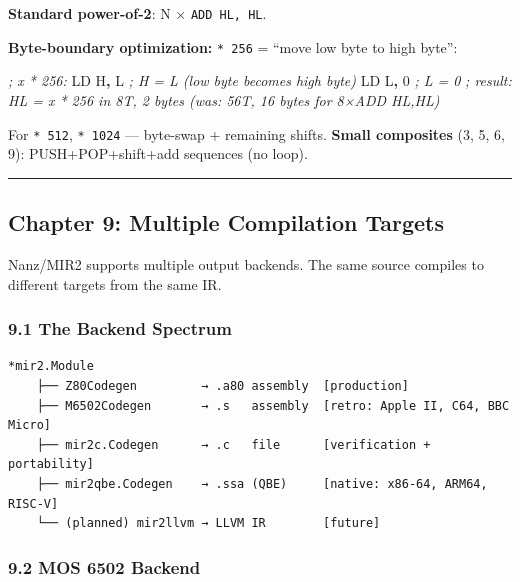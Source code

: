 \documentclass[
  11pt,
]{article}
\newenvironment{Shaded}{\begin{snugshade}}{\end{snugshade}}
\newcommand{\CommentTok}[1]{\textcolor[rgb]{0.56,0.35,0.01}{\textit{#1}}}
\newcommand{\DecValTok}[1]{\textcolor[rgb]{0.00,0.00,0.81}{#1}}
\newcommand{\NormalTok}[1]{#1}
\newcommand{\OperatorTok}[1]{\textcolor[rgb]{0.81,0.36,0.00}{\textbf{#1}}}
\begin{document}
\textbf{Standard power-of-2}: N × \texttt{ADD\ HL,\ HL}.

\textbf{Byte-boundary optimization:} \texttt{*\ 256} = ``move low byte
to high byte'':

\begin{Shaded}
\begin{Highlighting}[]
\CommentTok{; x * 256:}
\NormalTok{LD H}\OperatorTok{,}\NormalTok{ L     }\CommentTok{; H = L (low byte becomes high byte)}
\NormalTok{LD L}\OperatorTok{,} \DecValTok{0}     \CommentTok{; L = 0}
\CommentTok{; result: HL = x * 256 in 8T, 2 bytes (was: 56T, 16 bytes for 8×ADD HL,HL)}
\end{Highlighting}
\end{Shaded}

For \texttt{*\ 512}, \texttt{*\ 1024} --- byte-swap + remaining shifts.
\textbf{Small composites} (3, 5, 6, 9): PUSH+POP+shift+add sequences (no
loop).

\begin{center}\rule{0.5\linewidth}{0.5pt}\end{center}

\hypertarget{chapter-9-multiple-compilation-targets}{%
\subsection{Chapter 9: Multiple Compilation
Targets}\label{chapter-9-multiple-compilation-targets}}

Nanz/MIR2 supports multiple output backends. The same source compiles to
different targets from the same IR.

\hypertarget{the-backend-spectrum}{%
\subsubsection{9.1 The Backend Spectrum}\label{the-backend-spectrum}}

\begin{verbatim}
*mir2.Module
    ├── Z80Codegen         → .a80 assembly  [production]
    ├── M6502Codegen       → .s   assembly  [retro: Apple II, C64, BBC Micro]
    ├── mir2c.Codegen      → .c   file      [verification + portability]
    ├── mir2qbe.Codegen    → .ssa (QBE)     [native: x86-64, ARM64, RISC-V]
    └── (planned) mir2llvm → LLVM IR        [future]
\end{verbatim}

\hypertarget{mos-6502-backend}{%
\subsubsection{9.2 MOS 6502 Backend}\label{mos-6502-backend}}
\end{document}
